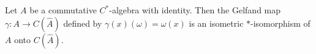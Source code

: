 Let $A$ be a commutative $C^*$-algebra with identity. Then the Gelfand map $\gamma: A \to C(\hat{A})$ defined by $\gamma(x)(\omega) = \omega(x)$ is an isometric $\ast$-isomorphism of $A$ onto $C(\hat{A})$.
